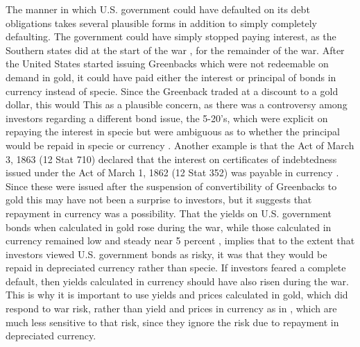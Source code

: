 The manner in which U.S. government could have defaulted on its debt obligations takes several plausible forms in addition to simply completely defaulting.
The government could have simply stopped paying interest, as the Southern states did at the start of the war \parencites[159]{BankersMagazine1862}[810,947]{BankersMagazine1860}, for the remainder of the war.
After the United States started issuing Greenbacks which were not redeemable on demand in gold, it could have paid either the interest or principal of bonds in currency instead of specie.
Since the Greenback traded at a discount to a gold dollar, this would 
This as a plausible concern, as there was a controversy among investors regarding a different bond issue, the 5-20's, which were explicit on repaying the interest in specie but were ambiguous as to whether the principal would be repaid in specie or currency \parencite{Roll1972}.
Another example is that the Act of March 3, 1863 (12 Stat 710) declared that the interest on certificates of indebtedness issued under the Act of March 1, 1862 (12 Stat 352) was payable in currency \parencite[81]{Bayley1882}.
Since these were issued after the suspension of convertibility of Greenbacks to gold this may have not been a surprise to investors, but it suggests that repayment in currency was a possibility. 
That the yields on U.S. government bonds when calculated in gold rose during the war, while those calculated in currency remained low and steady near 5 percent \parencite[305]{HomerSylla2005}, implies that to the extent that investors viewed U.S. government bonds as risky, it was that they would be repaid in depreciated currency rather than specie.%
If investors feared a complete default, then yields calculated in currency should have also risen during the war.
This is why it is important to use yields and prices calculated in gold, which did respond to war risk, rather than yield and prices in currency as in \textcite{HomerSylla2005}, which are much less sensitive to that risk, since they ignore the risk due to repayment in depreciated currency.

